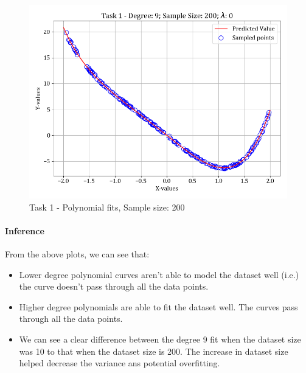 \documentclass[12pt,a4paper]{article}
\begin{document}
\begin{figure}[H]
    \includegraphics[scale=0.425]{images/t1_d1/d_9_size_200_l_0.png}
    \caption{Task 1 - Polynomial fits, Sample size: 200}
\end{figure}

\paragraph{Inference}
From the above plots, we can see that:
\begin{itemize}
    \itemsep0em
    \item Lower degree polynomial curves aren't able to model the dataset well (i.e.) the curve doesn't pass through all the data points.
    \item Higher degree polynomials are able to fit the dataset well. The curves pass through all the data points.
    \item We can see a clear difference between the degree 9 fit when the dataset size was 10 to that when the dataset size is 200. The increase in dataset size helped decrease the variance ans potential overfitting.
\end{itemize}
\end{document}
